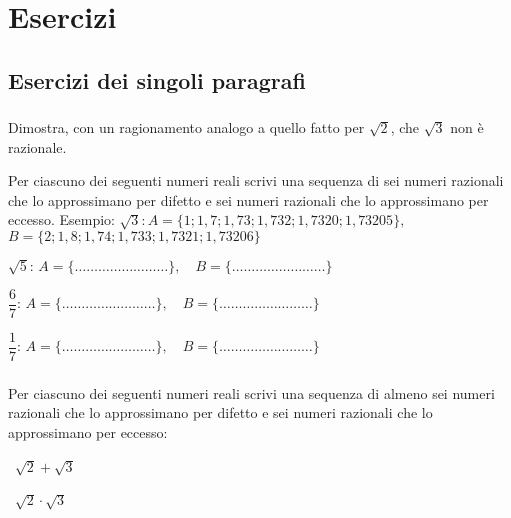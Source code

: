 
\section{Esercizi}

\subsection{Esercizi dei singoli paragrafi}

\subsubsection*{}

\begin{esercizio}
\label{ese:1.1}
Dimostra, con un ragionamento analogo a quello fatto per \(\sqrt 2\), che 
\(\sqrt 3\) non è razionale.
\end{esercizio}

\begin{esercizio}
\label{ese:1.2}
 Per ciascuno dei seguenti numeri reali scrivi una sequenza di sei numeri 
razionali che lo approssimano per difetto e sei numeri razionali che lo 
approssimano per eccesso. Esempio:
\(\sqrt 3\):\,\(A=\{1; 1,7; 1,73; 1,732; 1,7320; 1,73205\},\)\,\(B=\{2; 1,8; 
1,74; 1,733; 1,7321; 1,73206\}\)
\begin{enumeratea}
 \item\(\sqrt{5}:\, 
A=\{\ldots\ldots\ldots\ldots\ldots\ldots\ldots\ldots\},\quad 
B=\{\ldots\ldots\ldots\ldots\ldots\ldots\ldots\ldots\}\)
 \item\(\dfrac{6}{7}:\, 
A=\{\ldots\ldots\ldots\ldots\ldots\ldots\ldots\ldots\},\quad 
B=\{\ldots\ldots\ldots\ldots\ldots\ldots\ldots\ldots\}\)
 \item\(\dfrac{1}{7}:\, 
A=\{\ldots\ldots\ldots\ldots\ldots\ldots\ldots\ldots\},\quad 
B=\{\ldots\ldots\ldots\ldots\ldots\ldots\ldots\ldots\}\)
\end{enumeratea}
\end{esercizio}

\subsubsection*{}

\begin{esercizio}
\label{ese:1.3}
 Per ciascuno dei seguenti numeri reali scrivi una sequenza di almeno sei 
numeri razionali che lo approssimano per difetto e sei numeri razionali che 
lo approssimano per eccesso:
\begin{multicols}{2}
\begin{enumeratea}
 \item~\(\sqrt {2}+\sqrt {3}\)
 \item~\(\sqrt {2}\cdot\sqrt {3}\)
\end{enumeratea}
\end{multicols}
\end{esercizio}

